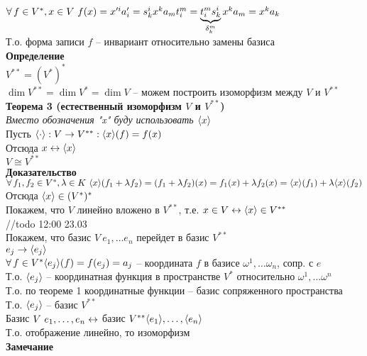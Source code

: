 \documentclass[12pt]{article}
\begin{document}
$\fall f \in V^*, x\in V\ f(x) = x'^ia'_i = s^i_k x^k a_m t^m_i = \ub{\delta^m_k}{t^m_i s^i_k} x^k a_m = x^ka_k$\\
Т.о. форма записи $f$ -- инвариант относительно замены базиса\\
\textbf{Определение}\\
$V^{**} = (V^*)^*$\\
$\dim V^{**} = \dim V^* = \dim V$ -- можем построить изоморфизм между $V$ и $V^{**}$\\
\textbf{Теорема 3 (естественный изоморфизм $V$ и $V^{**}$)}\\
\textit{Вместо обозначения "x" буду использовать $\lan x \ran$}\\
Пусть $\lan \cdot \ran: V \rto V^{**} : \lan x \ran(f) = f(x)$\\
Отсюда $x \lrto \lan x \ran$\\
$V\cong V^{**}$\\
\textbf{Доказательство}\\
$\fall f_1, f_2 \in V^*, \lambda \in K\ \lan x \ran(f_1+\lambda f_2) = (f_1 + \lambda f_2)(x) = f_1(x) + \lambda f_2(x) = \lan x \ran(f_1) + \lambda \lan x \ran(f_2)$\\
Отсюда $\lan x \ran \in (V^*)^*$\\
Покажем, что $V$ линейно вложено в $V^{**}$, т.е. $x \in V \lrto \lan x \ran \in V^{**}$\\
//todo 12:00 23.03\\
Покажем, что базис $V\ e_1, \ldots e_n$ перейдет в базис $V^{**}$\\
$e_j \rto \lan e_j\ran$\\
$\fall f\in V^* \lan e_j\ran(f) = f(e_j) = a_j$ -- координата $f$ в базисе $\omega^1, \ldots \omega_n$, сопр. с $e$\\
Т.о. $\lan e_j\ran$ -- координатная функция в пространстве $V^*$ относительно $\omega^1, \ldots \omega^n$\\
Т.о. по теореме 1 координатные функции -- базис сопряженного пространства\\
Т.о. $\lan e_j\ran$ -- базис $V^{**}$\\
Базис $V\ e_1,\ldots, e_n \lrto$ базис $V^{**} \lan e_1\ran, \ldots, \lan e_n\ran$\\
Т.о. отображение линейно, то изоморфизм\\
\textbf{Замечание}
\end{document}
